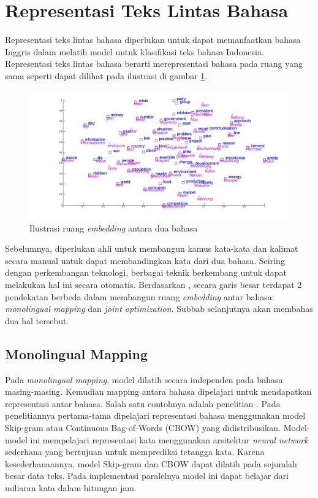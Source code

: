 \section{Representasi Teks Lintas Bahasa}
    Representasi teks lintas bahasa diperlukan untuk dapat memanfaatkan bahasa Inggris dalam melatih model untuk klasifikasi teks bahasa Indonesia. Representasi teks lintas bahasa berarti merepresentasi bahasa pada ruang yang sama seperti dapat dilihat pada ilustrasi di gambar \ref{fig:ilustrasi_embedding}.

    \begin{figure}[ht]
        \centering
        \includegraphics[width=1\textwidth]{resources/luong_et_al_2015.jpg}
        \caption{Ilustrasi ruang \textit{embedding} antara dua bahasa \parencite{Luong_Pham_Manning_2015}} 
        \label{fig:ilustrasi_embedding}
    \end{figure}

    Sebelumnya, diperlukan ahli untuk membangun kamus kata-kata dan kalimat secara manual untuk dapat membandingkan kata dari dua bahasa. Seiring dengan perkembangan teknologi, berbagai teknik berkembang untuk dapat melakukan hal ini secara otomatis. Berdasarkan \parencite{Wang_Xie_Xu_Yang_Neubig_Carbonell_2019}, secara garis besar terdapat 2 pendekatan berbeda dalam membangun ruang \textit{embedding} antar bahasa: \textit{monolingual mapping} dan \textit{joint optimization}. Subbab selanjutnya akan membahas dua hal tersebut.

    \subsection{Monolingual Mapping}

    Pada \textit{monolingual mapping},  model dilatih secara independen pada bahasa masing-masing. Kemudian mapping antara bahasa dipelajari untuk mendapatkan representasi antar bahasa. Salah satu contohnya adalah penelitian \parencite{MikolovEstimation}. Pada penelitiannya pertama-tama dipelajari representasi bahasa menggunakan model Skip-gram atau Continuous Bag-of-Words (CBOW) yang didistribusikan. Model-model ini mempelajari representasi kata menggunakan arsitektur \textit{neural network} sederhana yang bertujuan untuk memprediksi tetangga kata. Karena kesederhanaannya, model Skip-gram dan CBOW dapat dilatih pada sejumlah besar data teks. Pada implementasi paralelnya model ini dapat belajar dari miliaran kata dalam hitungan jam.

